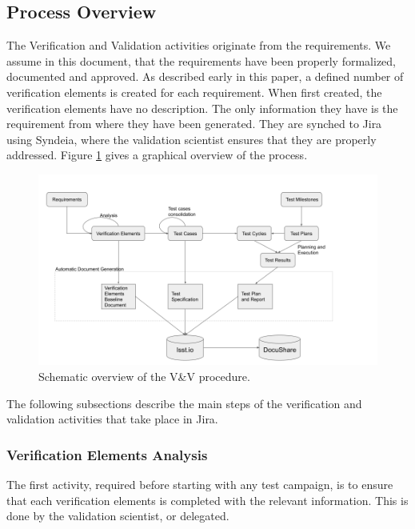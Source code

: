 \subsection{Process Overview}\label{sec:proc}

The Verification and Validation activities originate from the requirements.
We assume in this document, that the requirements have been properly formalized, documented and approved.
As described early in this paper, a defined number of verification elements is created for each requirement.
When first created, the verification elements have no description. The only information they have is the requirement from where they have been generated.
They are synched to Jira using Syndeia, where the validation scientist ensures that they are properly addressed.
Figure  \ref{fig:vandvtools} gives a graphical overview of the process.

\begin{figure}
\begin{center}
\includegraphics[width=\textwidth]{imgs/VandVprocedure.png}
 \caption{Schematic overview of the V\&V procedure.}
 \label{fig:vandvtools}
\end{center}
\end{figure}

The following subsections describe the main steps of the verification and validation activities that take place in Jira.


\subsubsection{Verification Elements Analysis}

The first activity, required before starting with any test campaign, is to ensure that each verification elements is completed with the relevant information.
This is done by the validation scientist, or delegated.

